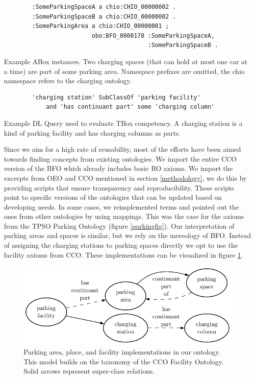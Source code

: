\begin{listing}[h]
    \begin{verbatim}
        :SomeParkingSpaceA a chio:CHIO_00000002 .
        :SomeParkingSpaceB a chio:CHIO_00000002 .
        :SomeParkingArea a chio:CHIO_00000001 ;
                         obo:BFO_0000178 :SomeParkingSpaceA,
                                         :SomeParkingSpaceB .
    \end{verbatim}
    \caption{Example ABox instances. Two charging spaces (that can hold at most one car at a time) are part of some parking area. Namespace prefixes are omitted, the chio namespace refers to the charging ontology.}
    \label{lst:2}
\end{listing}

\begin{listing}[h]
    \begin{verbatim}
        'charging station' SubClassOf 'parking facility' 
            and 'has continuant part' some 'charging column'
    \end{verbatim}
    \caption{Example DL Query used to evaluate TBox competency. A charging station is a kind of parking facility and has charging columns as parts.}
    \label{lst:3}
\end{listing}

Since we aim for a high rate of reusability, most of the efforts have been aimed
towards finding concepts from existing ontologies. We import the entire CCO
version of the BFO which already includes basic RO axioms. We import the
excerpts from OEO and CCO mentioned in section \ref{methodology}, we do this by
providing scripts that ensure transparency and reproducibility. These scripts
point to specific versions of the ontologies that can be updated based on
developing needs. In some cases, we reimplemented terms and pointed out the ones
from other ontologies by using mappings. This was the case for the axioms from
the TPSO Parking Ontology (figure \ref{parkingfig}). Our interpretation of
parking areas and spaces is similar, but we rely on the mereology of BFO.
Instead of assigning the charging stations to parking spaces directly we opt to
use the facility axioms from CCO. These implementations can be visualized in
figure \ref{parkingchio}.

\begin{figure}[h]
    \centering
    \includegraphics{images/CHIOParking.pdf}
    \caption{Parking area, place, and facility implementations in our ontology. This model builds on the taxonomy of the CCO Facility Ontology. Solid arrows represent super-class relations.}
    \label{parkingchio}
\end{figure}



    